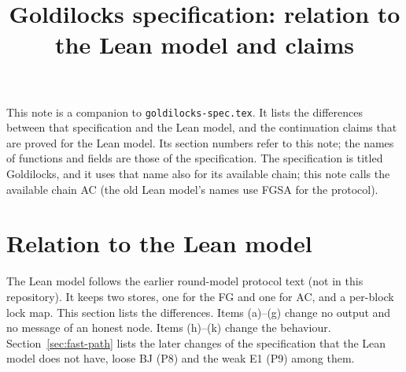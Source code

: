 \documentclass{article}
\title{Goldilocks specification: relation to the Lean model and claims}
\author{}
\date{}
\begin{document}
\maketitle

This note is a companion to \texttt{goldilocks-spec.tex}.  It lists the
differences between that specification and the Lean model, and the
continuation claims that are proved for the Lean model.  Its section
numbers refer to this note; the names of functions and fields are those
of the specification.  The specification is titled Goldilocks, and it uses that name
also for its available chain; this note calls the available chain AC (the
old Lean model's names use FGSA for the protocol).

\section{Relation to the Lean model}\label{sec:lean}

The Lean model follows the earlier round-model protocol text (not in this
repository).  It keeps two stores,
one for the FG and one for AC, and a per-block lock map.  This section
lists the differences.  Items (a)--(g) change no output and no message
of an honest node.  Items (h)--(k) change the behaviour.
Section~\ref{sec:fast-path} lists the later changes of the specification
that the Lean model does not have, loose BJ (P8) and the weak E1 (P9)
among them.
\end{document}
